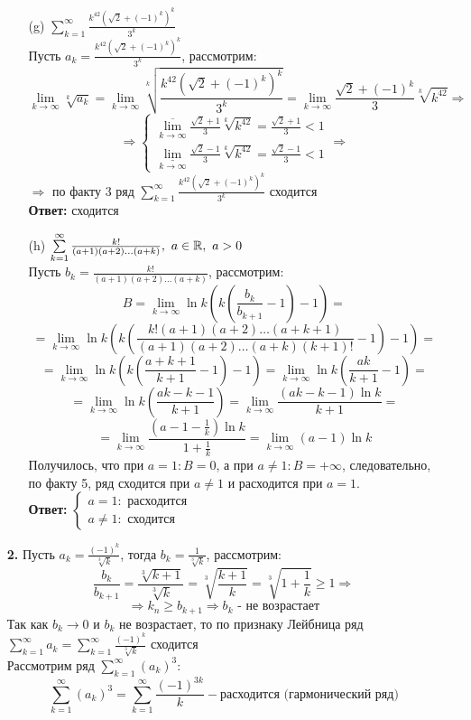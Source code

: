 \documentclass[a4paper]{article}
\renewcommand{\f}[2]{\frac{#1}{#2}}
\newcommand{\s}[2]{\sum\limits_{#1}^{#2}}
\newcommand{\case}[1]{\begin{cases} #1 \end{cases}}
\newcommand{\ts}{\text{\space}}
\newcommand{\lm}[1]{\underset{#1}{\lim}}
\newcommand{\suplm}[1]{\underset{#1}{\overline{\lim}}}
\newcommand{\inflm}[1]{\underset{#1}{\underline{\lim}}}
\renewcommand{\r}{\Rightarrow}
\renewcommand{\geq}{\geqslant}
\newcommand{\RR}{\mathbb{R}}
\begin{document}
\begin{enumerate}
\begin{enumerate}
        \item[(g)]$\s{k=1}{\infty}\f{k^{42}(\sqrt{2}+(-1)^k)^k}{3^k}$\\
        Пусть $a_k = \f{k^{42}(\sqrt{2}+(-1)^k)^k}{3^k}$, рассмотрим:
        $$\lim_{k \to \infty} \sqrt[k]{a_k} = \lim_{k \to \infty} \sqrt[k]{\f{k^{42}(\sqrt{2}+(-1)^k)^k}{3^k}} = \lim_{k \to \infty} \f{\sqrt{2}+(-1)^k}{3}\sqrt[k]{k^{42}} \r $$
        $$\r\case{
            \suplm{k \to \infty} \f{\sqrt{2}+1}{3}\sqrt[k]{k^{42}} = \f{\sqrt{2}+1}{3} < 1\\
            \inflm{k \to \infty} \f{\sqrt{2}-1}{3}\sqrt[k]{k^{42}} = \f{\sqrt{2}-1}{3} < 1
        } \r $$
        $\r$ по факту 3 ряд $\s{k=1}{\infty}\f{k^{42}(\sqrt{2}+(-1)^k)^k}{3^k}$ сходится\\
        \textbf{Ответ: } сходится\\

        \item[(h)]$\s{k=1}{\infty} \f{k!}{(a+1)(a+2)\dots(a+k)}, \ts a \in \RR, \ts a > 0$\\
        Пусть $b_k = \f{k!}{(a+1)(a+2)\dots(a+k)}$, рассмотрим:
        $$B = \lm{k \to \infty}\ln{k}(k(\f{b_k}{b_{k+1}} - 1) - 1)=$$
        $$= \lm{k \to \infty}\ln{k}(k(\f{k!(a+1)(a+2)\dots(a+k+1)}{(a+1)(a+2)\dots(a+k)(k+1)!} - 1) - 1) = $$
        $$ = \lm{k \to \infty}\ln{k}(k(\f{a+k+1}{k+1} - 1) - 1) = \lm{k \to \infty}\ln{k}(\f{ak}{k+1} - 1) = $$
        $$ = \lm{k \to \infty}\ln{k}(\f{ak- k - 1}{k+1}) = \lm{k \to \infty}\f{(ak- k - 1)\ln{k}}{k+1} = $$
        $$= \lm{k \to \infty}\f{(a- 1 - \f{1}{k})\ln{k}}{1+\f{1}{k}} = \lm{k \to \infty}(a- 1)\ln{k}$$
        Получилось, что при $a = 1: B = 0$, а при $a \neq 1: B = +\infty$, следовательно, по факту 5, ряд сходится при $a \neq 1$ и расходится при $a = 1$.\\
        \textbf{Ответ: } $\case{ a = 1: \text{ расходится} \\ a \neq 1: \text{ сходится}}$\\
    \end{enumerate}
    
    \item[\textbf{2.}]Пусть $a_k = \f{(-1)^k}{\sqrt[3]{k}}$, тогда $b_k = \f{1}{\sqrt[3]{k}}$, рассмотрим:
    $$\f{b_{k}}{b_{k+1}} = \f{\sqrt[3]{k+1}}{\sqrt[3]{k}} = \sqrt[3]{\f{k+1}{k}} = \sqrt[3]{1+\f{1}{k}} \geq 1 \r $$
    $$\r k_{n} \geq b_{k+1} \r b_k \text{ - не возрастает}$$
    Так как $b_k \to 0$ и $b_k$ не возрастает, то по признаку Лейбница ряд $\s{k=1}{\infty}a_k = \s{k=1}{\infty}\f{(-1)^k}{\sqrt[3]{k}}$ сходится\\
    Рассмотрим ряд $\s{k=1}{\infty}(a_k)^3$:
    $$\s{k=1}{\infty}(a_k)^3 = \s{k=1}{\infty}\f{(-1)^{3k}}{k} - \text{расходится (гармонический ряд)}$$
\end{enumerate}
\end{document}
